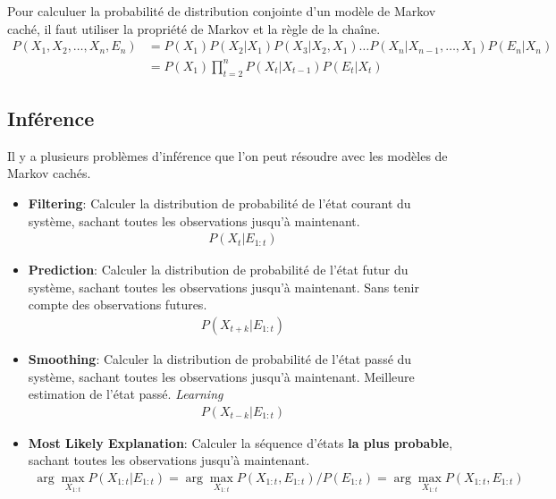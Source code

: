 Pour calculuer la probabilité de distribution conjointe d'un modèle de Markov caché, 
il faut utiliser la propriété de Markov et la règle de la chaîne. 
\begin{align*}
    P(X_1, X_2, \dots, X_n, E_n) &= P(X_1) P(X_2 | X_1) P(X_3 | X_2, X_1) \dots P(X_n | X_{n-1}, \dots, X_1) P(E_n | X_n) \\
                            &= P(X_1) \prod_{t=2}^n P(X_t | X_{t-1}) P(E_t | X_t)
\end{align*}


\subsection{Inférence} %
\label{sub:inference}

Il y a plusieurs problèmes d'inférence que l'on peut résoudre avec les modèles de Markov cachés. 

\begin{itemize}
    \item \textbf{Filtering}: Calculer la distribution de probabilité de l'état courant du système, 
    sachant toutes les observations jusqu'à maintenant. 
    \begin{align*}
        P(X_t | E_{1:t}) 
    \end{align*}
    \item \textbf{Prediction}: Calculer la distribution de probabilité de l'état futur du système, 
    sachant toutes les observations jusqu'à maintenant. Sans tenir compte des observations futures.
    \begin{align*}
        P(X_{t+k} | E_{1:t}) 
    \end{align*}
    \item \textbf{Smoothing}: Calculer la distribution de probabilité de l'état passé du système, 
    sachant toutes les observations jusqu'à maintenant. Meilleure estimation de l'état passé. \textit{Learning}
    \begin{align*}
        P(X_{t-k} | E_{1:t}) 
    \end{align*}
    \item \textbf{Most Likely Explanation}: Calculer la séquence d'états \textbf{la plus probable}, 
    sachant toutes les observations jusqu'à maintenant. 
    \begin{align*}
        \arg \max_{X_{1:t}} P(X_{1:t} | E_{1:t}) = \arg \max_{X_{1:t}} P(X_{1:t} ,E_{1:t}) / P(E_{1:t}) = \arg \max_{X_{1:t}} P(X_{1:t} ,E_{1:t})
    \end{align*}
\end{itemize} 

